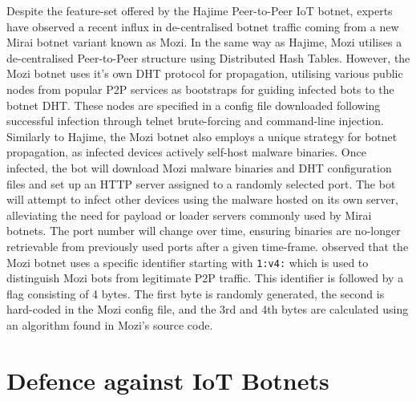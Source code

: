 Despite the feature-set offered by the Hajime Peer-to-Peer IoT botnet, experts have observed a recent influx in de-centralised botnet traffic coming from a new Mirai botnet variant known as Mozi. \citep{Netlab2019} In the same way as Hajime, Mozi utilises a de-centralised Peer-to-Peer structure using Distributed Hash Tables. However, the Mozi botnet uses it's own DHT protocol for propagation, utilising various public nodes from popular P2P services as bootstraps for guiding infected bots to the botnet DHT. These nodes are specified in a config file downloaded following successful infection through telnet brute-forcing and command-line injection. Similarly to Hajime, the Mozi botnet also employs a unique strategy for botnet propagation, as infected devices actively self-host malware binaries. Once infected, the bot will download Mozi malware binaries and DHT configuration files and set up an HTTP server assigned to a randomly selected port. The bot will attempt to infect other devices using the malware hosted on its own server, alleviating the need for payload or loader servers commonly used by Mirai botnets. The port number will change over time, ensuring binaries are no-longer retrievable from previously used ports after a given time-frame. \citet{Netlab2019} observed that the Mozi botnet uses a specific identifier starting with \texttt{1:v4:} which is used to distinguish Mozi bots from legitimate P2P traffic. This identifier is followed by a flag consisting of 4 bytes. The first byte is randomly generated, the second is hard-coded in the Mozi config file, and the 3rd and 4th bytes are calculated using an algorithm found in Mozi's source code.




\section{Defence against IoT Botnets}

